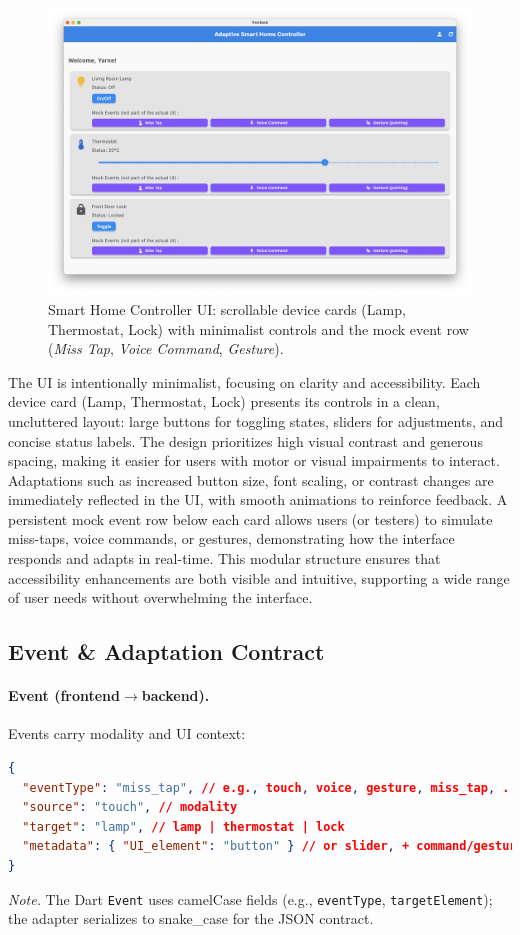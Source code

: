 \begin{figure}[H]
\centering
\includegraphics[width=.9\linewidth]{images/fig_ui_overview.png}
\caption{Smart Home Controller UI: scrollable device cards (Lamp, Thermostat, Lock) with minimalist controls and the mock event row (\emph{Miss Tap}, \emph{Voice Command}, \emph{Gesture}).}
\label{fig:ui_overview}
\end{figure}

The UI is intentionally minimalist, focusing on clarity and accessibility. Each device card (Lamp, Thermostat, Lock) presents its controls in a clean, uncluttered layout: large buttons for toggling states, sliders for adjustments, and concise status labels. The design prioritizes high visual contrast and generous spacing, making it easier for users with motor or visual impairments to interact. Adaptations such as increased button size, font scaling, or contrast changes are immediately reflected in the UI, with smooth animations to reinforce feedback. A persistent mock event row below each card allows users (or testers) to simulate miss-taps, voice commands, or gestures, demonstrating how the interface responds and adapts in real-time. This modular structure ensures that accessibility enhancements are both visible and intuitive, supporting a wide range of user needs without overwhelming the interface.

\subsection{Event \& Adaptation Contract}
\label{sec:event_adaptation_contract}
\paragraph{Event (frontend$\rightarrow$backend).} Events carry modality and UI context:
\begin{lstlisting}[language=json, basicstyle=\ttfamily\small, caption={Event structure}]
{
  "eventType": "miss_tap", // e.g., touch, voice, gesture, miss_tap, ...
  "source": "touch", // modality
  "target": "lamp", // lamp | thermostat | lock
  "metadata": { "UI_element": "button" } // or slider, + command/gesture fields
}
\end{lstlisting}
\noindent\emph{Note.} The Dart \texttt{Event} uses camelCase fields (e.g., \texttt{eventType}, \texttt{targetElement}); the adapter serializes to snake\_case for the JSON contract.

